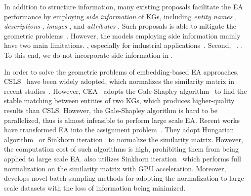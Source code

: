 In addition to structure information, many existing proposals facilitate the EA performance by employing \emph{side information} of KGs,  including
\emph{entity names} \cite{JAPE17,MultiKE19,DGMC20,DegreeAware20,BERT-INT20, AttrGNN20, EASY21, SEU21, LargeEA22}, \emph{descriptions} \cite{MultiKE19, BERT-INT20}, \emph{images} \cite{EVA20}, and \emph{attributes} \cite{JAPE17,GCN-Align18,MultiKE19,COTSAE20,BERT-INT20,AttrGNN20,EPEA20}.  Such proposals is able to mitigate the geometric problems~\cite{OpenEA2020VLDB}.
However, the models employing side information mainly have two main limitations. , especially for
industrial applications~\cite{DualAMN21,RREA20, MRAEA20}. 
Second, ~\cite{JEANS20, AttrGNN20, EVA20, NoMatch21}. 
.
To this end, we do not incorporate side information in \ClusterEA{}.

In order to solve the geometric problems of embedding-based EA approaches, CSLS~\cite{CSLS} have been widely adopted, which normalizes the similarity matrix in recent studies~\cite{TransEdge19,EVA20, RREA20, EASY21}. 
However,  
CEA~\cite{CEAFF20, CEAFF21} adopts the Gale-Shapley algorithm~\cite{GaleShapley} to find the stable matching between entities of two KGs, which produces higher-quality results than CSLS. 
However, the Gale-Shapley algorithm is hard to be parallelized, thus is almost infeasible to perform large scale EA. Recent works have transformed EA into the assignment problem~\cite{EASY21, SEU21}. They adopt Hungarian algorithm~\cite{Hungarian1955} or Sinkhorn iteration~\cite{Sinkhorn13} to normalize the similarity matrix. However, the computation cost of such algorithms is high, prohibiting them from being applied to large scale EA.
\ClusterEA{} also utilizes Sinkhorn iteration~\cite{Sinkhorn13} which performs full normalization on the similarity matrix with GPU acceleration. Moreover, \ClusterEA{} develops novel batch-sampling methods for adopting the normalization to large-scale datasets with the loss of information being minimized.



